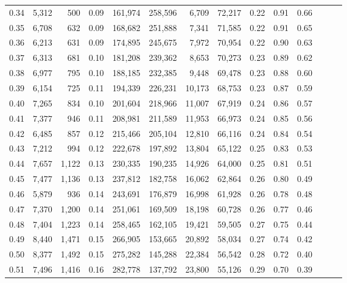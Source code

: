\begin{tabular}{rrrrrrrrrrrrrr}
0.34 &   5,312 &    500 &  0.09 &  161,974 &  258,596 &   6,709 &  72,217 &  0.22 &  0.91 &      0.66 \\
0.35 &   6,708 &    632 &  0.09 &  168,682 &  251,888 &   7,341 &  71,585 &  0.22 &  0.91 &      0.65 \\
0.36 &   6,213 &    631 &  0.09 &  174,895 &  245,675 &   7,972 &  70,954 &  0.22 &  0.90 &      0.63 \\
0.37 &   6,313 &    681 &  0.10 &  181,208 &  239,362 &   8,653 &  70,273 &  0.23 &  0.89 &      0.62 \\
0.38 &   6,977 &    795 &  0.10 &  188,185 &  232,385 &   9,448 &  69,478 &  0.23 &  0.88 &      0.60 \\
0.39 &   6,154 &    725 &  0.11 &  194,339 &  226,231 &  10,173 &  68,753 &  0.23 &  0.87 &      0.59 \\
0.40 &   7,265 &    834 &  0.10 &  201,604 &  218,966 &  11,007 &  67,919 &  0.24 &  0.86 &      0.57 \\
0.41 &   7,377 &    946 &  0.11 &  208,981 &  211,589 &  11,953 &  66,973 &  0.24 &  0.85 &      0.56 \\
0.42 &   6,485 &    857 &  0.12 &  215,466 &  205,104 &  12,810 &  66,116 &  0.24 &  0.84 &      0.54 \\
0.43 &   7,212 &    994 &  0.12 &  222,678 &  197,892 &  13,804 &  65,122 &  0.25 &  0.83 &      0.53 \\
0.44 &   7,657 &  1,122 &  0.13 &  230,335 &  190,235 &  14,926 &  64,000 &  0.25 &  0.81 &      0.51 \\
0.45 &   7,477 &  1,136 &  0.13 &  237,812 &  182,758 &  16,062 &  62,864 &  0.26 &  0.80 &      0.49 \\
0.46 &   5,879 &    936 &  0.14 &  243,691 &  176,879 &  16,998 &  61,928 &  0.26 &  0.78 &      0.48 \\
0.47 &   7,370 &  1,200 &  0.14 &  251,061 &  169,509 &  18,198 &  60,728 &  0.26 &  0.77 &      0.46 \\
0.48 &   7,404 &  1,223 &  0.14 &  258,465 &  162,105 &  19,421 &  59,505 &  0.27 &  0.75 &      0.44 \\
0.49 &   8,440 &  1,471 &  0.15 &  266,905 &  153,665 &  20,892 &  58,034 &  0.27 &  0.74 &      0.42 \\
0.50 &   8,377 &  1,492 &  0.15 &  275,282 &  145,288 &  22,384 &  56,542 &  0.28 &  0.72 &      0.40 \\
0.51 &   7,496 &  1,416 &  0.16 &  282,778 &  137,792 &  23,800 &  55,126 &  0.29 &  0.70 &      0.39 \\

\end{tabular}
